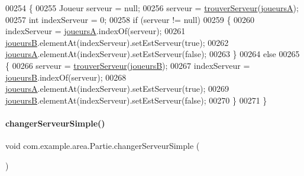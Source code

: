 \begin{DoxyCode}
00254     \{
00255         Joueur serveur = null;
00256         serveur = \hyperlink{classcom_1_1example_1_1area_1_1_partie_a34c737de89dee9e2510fa5959e238a3e}{trouverServeur}(\hyperlink{classcom_1_1example_1_1area_1_1_partie_a190a033a96ec435589ac53f78d60890b}{joueursA});
00257         \textcolor{keywordtype}{int} indexServeur = 0;
00258         \textcolor{keywordflow}{if} (serveur != null)
00259         \{
00260             indexServeur = \hyperlink{classcom_1_1example_1_1area_1_1_partie_a190a033a96ec435589ac53f78d60890b}{joueursA}.indexOf(serveur);
00261             \hyperlink{classcom_1_1example_1_1area_1_1_partie_a208910b83df461c3a2503f3b28650ce8}{joueursB}.elementAt(indexServeur).setEstServeur(\textcolor{keyword}{true});
00262             \hyperlink{classcom_1_1example_1_1area_1_1_partie_a190a033a96ec435589ac53f78d60890b}{joueursA}.elementAt(indexServeur).setEstServeur(\textcolor{keyword}{false});
00263         \}
00264         \textcolor{keywordflow}{else}
00265         \{
00266             serveur = \hyperlink{classcom_1_1example_1_1area_1_1_partie_a34c737de89dee9e2510fa5959e238a3e}{trouverServeur}(\hyperlink{classcom_1_1example_1_1area_1_1_partie_a208910b83df461c3a2503f3b28650ce8}{joueursB});
00267             indexServeur = \hyperlink{classcom_1_1example_1_1area_1_1_partie_a208910b83df461c3a2503f3b28650ce8}{joueursB}.indexOf(serveur);
00268             \hyperlink{classcom_1_1example_1_1area_1_1_partie_a190a033a96ec435589ac53f78d60890b}{joueursA}.elementAt(indexServeur).setEstServeur(\textcolor{keyword}{true});
00269             \hyperlink{classcom_1_1example_1_1area_1_1_partie_a208910b83df461c3a2503f3b28650ce8}{joueursB}.elementAt(indexServeur).setEstServeur(\textcolor{keyword}{false});
00270         \}
00271     \}
\end{DoxyCode}
\mbox{\label{classcom_1_1example_1_1area_1_1_partie_ad6d7eef6348a783f9cdd0eb3dd14793d}} 
\paragraph{\texorpdfstring{changer\+Serveur\+Simple()}{changerServeurSimple()}}
{\footnotesize\ttfamily void com.\+example.\+area.\+Partie.\+changer\+Serveur\+Simple (\begin{DoxyParamCaption}{ }\end{DoxyParamCaption})\hspace{0.3cm}{\ttfamily [private]}}



